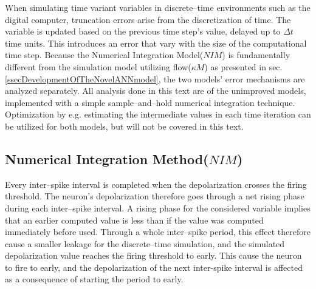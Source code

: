         When simulating time variant variables in discrete--time  environments such as the digital computer, truncation errors arise from the discretization of time.
        The variable is updated based on the previous time step's value, delayed up to $\Delta t$ time units.
        This introduces an error that vary with the size of the computational time step.
        Because the Numerical Integration Model($NIM$) is fundamentally different from the simulation model utilizing flow($\kappa M$) as presented in sec. \ref{ssecDevelopmentOfTheNovelANNmodel}, the two models' error mechanisms are analyzed separately.
%
        All analysis done in this text are of the unimproved models, implemented with a simple sample--and--hold numerical integration technique.
        Optimization by e.g. estimating the intermediate values in each time iteration can be utilized for both models, but will not be covered in this text.




	\subsection{Numerical Integration Method($NIM$)}
	\label{ssecErrorForNIM}
	Every inter--spike interval is completed when the depolarization crosses the firing threshold. The neuron's depolarization therefore goes through a net rising phase during each inter--spike interval.
	A rising phase for the considered variable implies that an earlier computed value is less than if the value was computed immediately before used.
	Through a whole inter--spike period, this effect therefore cause a smaller leakage for the discrete--time simulation, and the simulated depolarization value reaches the firing threshold to early.
	This cause the neuron to fire to early, and the depolarization of the next inter-spike interval is affected as a consequence of starting the period to early.
	
